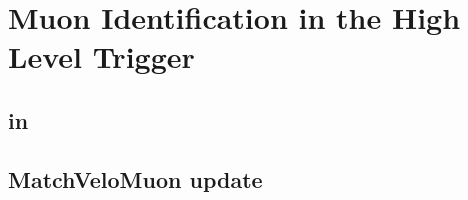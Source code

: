 
\chapter{Muon Identification in the \lhcb High Level Trigger}
\label{Muon_id_hlt}


\section{\muonID in \hltone}


\section{MatchVeloMuon update}

